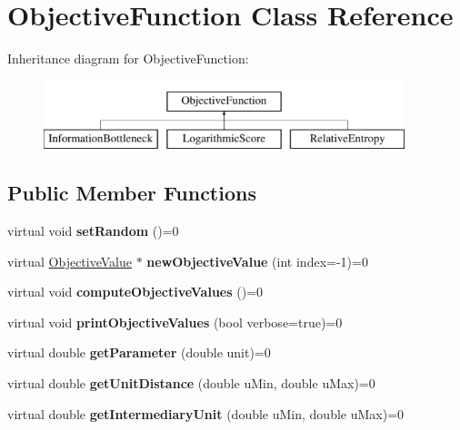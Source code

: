 \hypertarget{classObjectiveFunction}{\section{Objective\-Function Class Reference}
\label{classObjectiveFunction}
}
Inheritance diagram for Objective\-Function\-:\begin{figure}[H]
\begin{center}
\leavevmode
\includegraphics[height=2.000000cm]{classObjectiveFunction}
\end{center}
\end{figure}
\subsection*{Public Member Functions}
\begin{DoxyCompactItemize}
\item 
\hypertarget{classObjectiveFunction_a897009c58cc55bc84c29e5e3a2bfcb61}{virtual void {\bfseries set\-Random} ()=0}\label{classObjectiveFunction_a897009c58cc55bc84c29e5e3a2bfcb61}

\item 
\hypertarget{classObjectiveFunction_a4d302f7cdf40ca80d6d186cbf8851b8f}{virtual \hyperlink{classObjectiveValue}{Objective\-Value} $\ast$ {\bfseries new\-Objective\-Value} (int index=-\/1)=0}\label{classObjectiveFunction_a4d302f7cdf40ca80d6d186cbf8851b8f}

\item 
\hypertarget{classObjectiveFunction_a517095eb98863d0727a768d92fe2da0f}{virtual void {\bfseries compute\-Objective\-Values} ()=0}\label{classObjectiveFunction_a517095eb98863d0727a768d92fe2da0f}

\item 
\hypertarget{classObjectiveFunction_a7c59c162ea11841ade84d62fd29f0694}{virtual void {\bfseries print\-Objective\-Values} (bool verbose=true)=0}\label{classObjectiveFunction_a7c59c162ea11841ade84d62fd29f0694}

\item 
\hypertarget{classObjectiveFunction_a33d5014b560a6bb540558d25595b7c35}{virtual double {\bfseries get\-Parameter} (double unit)=0}\label{classObjectiveFunction_a33d5014b560a6bb540558d25595b7c35}

\item 
\hypertarget{classObjectiveFunction_abf21d384a51182fd183a580c1a4a5962}{virtual double {\bfseries get\-Unit\-Distance} (double u\-Min, double u\-Max)=0}\label{classObjectiveFunction_abf21d384a51182fd183a580c1a4a5962}

\item 
\hypertarget{classObjectiveFunction_ac554fa0076afa2d68a544e626e2e28a2}{virtual double {\bfseries get\-Intermediary\-Unit} (double u\-Min, double u\-Max)=0}\label{classObjectiveFunction_ac554fa0076afa2d68a544e626e2e28a2}

\end{DoxyCompactItemize}
